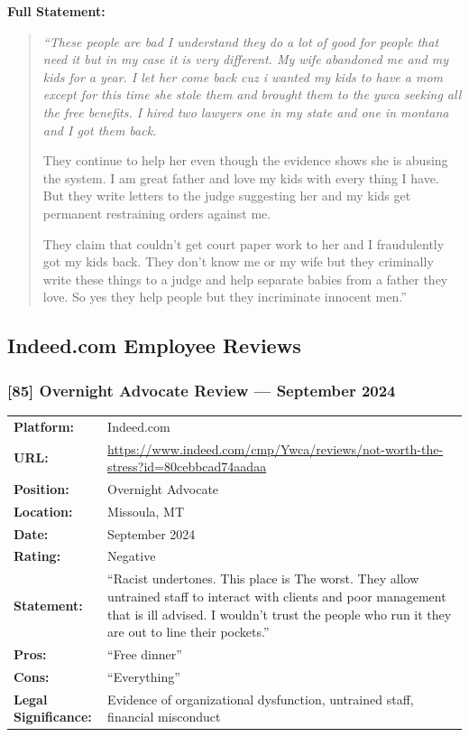 \documentclass[11pt,letterpaper]{article}
\newcommand{\citeref}[1]{\textbf{\color{NavyBlue}[#1]}}
\begin{document}
\vspace{0.1in}

\textbf{Full Statement:}

\begin{quote}
\itshape
``These people are bad I understand they do a lot of good for people that need it but in my case it is very different. My wife abandoned me and my kids for a year. I let her come back cuz i wanted my kids to have a mom except for this time she stole them and brought them to the ywca seeking all the free benefits. I hired two lawyers one in my state and one in montana and I got them back.

They continue to help her even though the evidence shows she is abusing the system. I am great father and love my kids with every thing I have. But they write letters to the judge suggesting her and my kids get permanent restraining orders against me.

They claim that couldn't get court paper work to her and I fraudulently got my kids back. They don't know me or my wife but they criminally write these things to a judge and help separate babies from a father they love. So yes they help people but they incriminate innocent men.''
\end{quote}

\subsection{Indeed.com Employee Reviews}

\subsubsection{\citeref{85} Overnight Advocate Review --- September 2024}

\begin{tabular}{@{}p{1.4in}p{4.6in}@{}}
\textbf{Platform:} & Indeed.com\\
\textbf{URL:} & \url{https://www.indeed.com/cmp/Ywca/reviews/not-worth-the-stress?id=80cebbcad74aadaa}\\
\textbf{Position:} & Overnight Advocate\\
\textbf{Location:} & Missoula, MT\\
\textbf{Date:} & September 2024\\
\textbf{Rating:} & Negative\\
\textbf{Statement:} & ``Racist undertones. This place is The worst. They allow untrained staff to interact with clients and poor management that is ill advised. I wouldn't trust the people who run it they are out to line their pockets.''\\
\textbf{Pros:} & ``Free dinner''\\
\textbf{Cons:} & ``Everything''\\
\textbf{Legal Significance:} & Evidence of organizational dysfunction, untrained staff, financial misconduct\\
\end{tabular}
\end{document}
